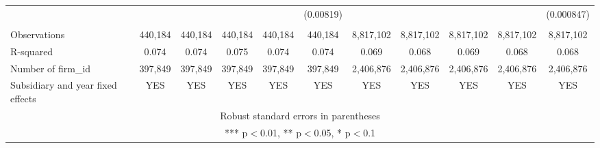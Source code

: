 \begin{tabular}{lcccccccccc}
 &  &  &  &  & (0.00819) &  &  &  &  & (0.000847) \\
 &  &  &  &  &  &  &  &  &  &  \\
Observations & 440,184 & 440,184 & 440,184 & 440,184 & 440,184 & 8,817,102 & 8,817,102 & 8,817,102 & 8,817,102 & 8,817,102 \\
R-squared & 0.074 & 0.074 & 0.075 & 0.074 & 0.074 & 0.069 & 0.068 & 0.069 & 0.068 & 0.068 \\
Number of firm\_id & 397,849 & 397,849 & 397,849 & 397,849 & 397,849 & 2,406,876 & 2,406,876 & 2,406,876 & 2,406,876 & 2,406,876 \\
 Subsidiary and year fixed effects & YES & YES & YES & YES & YES & YES & YES & YES & YES & YES \\ \hline
\multicolumn{11}{c}{ Robust standard errors in parentheses} \\
\multicolumn{11}{c}{ *** p$<$0.01, ** p$<$0.05, * p$<$0.1} \\
\end{tabular}
